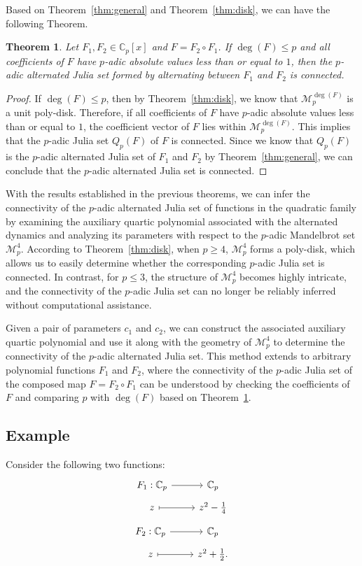 \documentclass{amsart}
\theoremstyle{plain}
\newtheorem{theorem}{Theorem}[section]
\theoremstyle{definition}
\theoremstyle{remark}
\numberwithin{equation}{section}
\newcommand{\C}{\mathbb{C}}
\newcommand{\calm}{\mathcal{M}}
\begin{document}
Based on Theorem~\ref{thm:general} and Theorem~\ref{thm:disk}, we can have the following Theorem.
\begin{theorem}    
    \label{thm:p-adic connectivity}
    Let $F_1, F_2 \in \C_p[x]$ and $F = F_2\circ F_1$. If $\deg(F) \leq p$ and all coefficients of $F$ have $p$-adic absolute values less than or equal to $1$, then the $p$-adic alternated Julia set formed by alternating between $F_1$ and $F_2$ is connected.
\end{theorem}
\begin{proof}
    If $\deg(F) \leq p$, then by Theorem~\ref{thm:disk}, we know that $\calm_p^{\deg(F)}$ is a unit poly-disk. Therefore, if all coefficients of $F$ have $p$-adic absolute values less than or equal to $1$, the coefficient vector of $F$ lies within $\calm_p^{\deg(F)}$. This implies that the $p$-adic Julia set $Q_p(F)$ of $F$ is connected. Since we know that $Q_p(F)$ is the $p$-adic alternated Julia set of $F_1$ and $F_2$ by Theorem~\ref{thm:general}, we can conclude that the $p$-adic alternated Julia set is connected.
\end{proof}
With the results established in the previous theorems, we can infer the connectivity of the $p$-adic alternated Julia set of functions in the quadratic family by examining the auxiliary quartic polynomial associated with the alternated dynamics and analyzing its parameters with respect to the $p$-adic Mandelbrot set $\calm_p^4$. According to Theorem~\ref{thm:disk}, when $p\geq 4$, $\calm_p^4$ forms a poly-disk, which allows us to easily determine whether the corresponding $p$-adic Julia set is connected. In contrast, for $p\leq3$, the structure of $\calm_p^4$ becomes highly intricate, and the connectivity of the $p$-adic Julia set can no longer be reliably inferred without computational assistance.

Given a pair of parameters $c_1$ and $c_2$, we can construct the associated auxiliary quartic polynomial and use it along with the geometry of \(\calm_p^4\) to determine the connectivity of the \(p\)-adic alternated Julia set. This method extends to arbitrary polynomial functions \(F_1\) and \(F_2\), where the connectivity of the \(p\)-adic Julia set of the composed map \(F = F_2\circ F_1\) can be understood by checking the coefficients of \(F\) and comparing \(p\) with \(\deg(F)\) based on Theorem~\ref{thm:p-adic connectivity}.

\subsection{Example}
Consider the following two functions:
    \[
      \begin{tikzcd}[row sep=tiny]
        F_1: \C_p \arrow[r] & \C_p \\
        z \arrow[r, mapsto] & z^2 - \frac{1}{4} \end{tikzcd}\]
        \[\begin{tikzcd}[row sep=tiny]
        F_2: \C_p \arrow[r] & \C_p \\
        z \arrow[r, mapsto] & z^2 + \frac{1}{2}. 
      \end{tikzcd}\]
\end{document}
